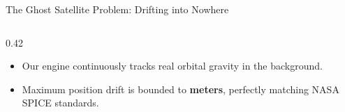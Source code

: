 \documentclass[aspectratio=169,10pt]{beamer}
\begin{document}
\begin{frame}{The Ghost Satellite Problem: Drifting into Nowhere}
\begin{columns}[T]
\begin{column}{0.42\textwidth}
      \vspace{1.5pt}
      \begin{tcolorbox}[colback=lightGreen,colframe=greenAccent,title=\textbf{Our Adaptive Accuracy},top=1.5pt,bottom=1.5pt]
        \small
        \begin{itemize}\setlength{\itemsep}{1.5pt}
          \item Our engine continuously tracks real orbital gravity in the background.
          \item Maximum position drift is bounded to \textbf{meters}, perfectly matching NASA SPICE standards.
        \end{itemize}
      \end{tcolorbox}
    \end{column}
  \end{columns}
\end{frame}
\end{document}
